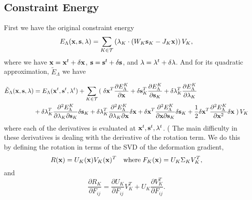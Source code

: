 \subsection{Constraint Energy}

First we have the original constraint energy
\begin{equation}
E_\Lambda (\mathbf{x}, \mathbf{s}, \mathbf{\lambda}) = \sum_{K \in \mathcal{T}} \left( \mathbf{\lambda}_K \cdot (W_K \mathbf{s}_K - J_K \mathbf{x}) \right) V_K,
\end{equation}
where we have $\mathbf{x} = \mathbf{x}^t + \delta \mathbf{x}$, $\mathbf{s} = \mathbf{s}^t + \delta \mathbf{s}$, and $\mathbf{\lambda} = \mathbf{\lambda}^t + \delta \mathbf{\lambda}$. And for its quadratic approximation, $\tilde{E}_\Lambda$ we have

\begin{equation}
\begin{split}
\tilde{E}_\Lambda (\mathbf{x}, \mathbf{s}, \mathbf{\lambda}) &=  E_\Lambda (\mathbf{x}^t,\mathbf{s}^t,\mathbf{\lambda}^t) 
+ \sum_{K \in \mathcal{T}} \left( \right.
  \delta \mathbf{x}^T \frac{\partial E_\Lambda^K}{\partial \mathbf{x}} 
+ \delta \mathbf{s}_K^T \frac{\partial E_\Lambda^K}{\partial \mathbf{s}_K}
+ \delta \mathbf{\lambda}_K^T \frac{\partial E_\Lambda^K}{\partial \mathbf{\lambda}_K} \\
&+ \delta \mathbf{\lambda}_K^T \frac{\partial^2 E_\Lambda^K}{\partial \mathbf{\lambda}_K \partial \mathbf{s}_K} \delta \mathbf{s}_K
+ \delta \mathbf{\lambda}_K^T \frac{\partial^2 E_\Lambda^K}{\partial \mathbf{\lambda}_K \partial \mathbf{x}} \delta \mathbf{x}
+ \delta \mathbf{x}^T \frac{\partial^2 E_\Lambda^K}{\partial \mathbf{x} \partial \mathbf{s}_K} \delta \mathbf{s}_K
+ \frac{1}{2} \delta \mathbf{x}^T \frac{\partial^2 E_\Lambda^K}{\partial \mathbf{x}^2} \delta \mathbf{x}
\left. \right) V_K
\end{split}
\end{equation}
where each of the derivatives is evaluated at $\mathbf{x}^t, \mathbf{s}^t, \mathbf{\lambda}^t$. ( The main difficulty in these derivatives is dealing with the derivative of the rotation term. We do this by defining the rotation in terms of the SVD of the deformation gradient,
\begin{equation}
R(\mathbf{x}) = U_K(\mathbf{x}) V_K(\mathbf{x})^T \quad \text{where} \; F_K(\mathbf{x}) = U_K \Sigma_K V_K^T,
\end{equation}
and
\begin{equation}
\frac{\partial R_K}{\partial F_{ij}} = \frac{\partial U_K}{\partial F_{ij}}V_K^T
+ U_K \frac{\partial V_K^T}{\partial F_{ij}}.
\end{equation}

